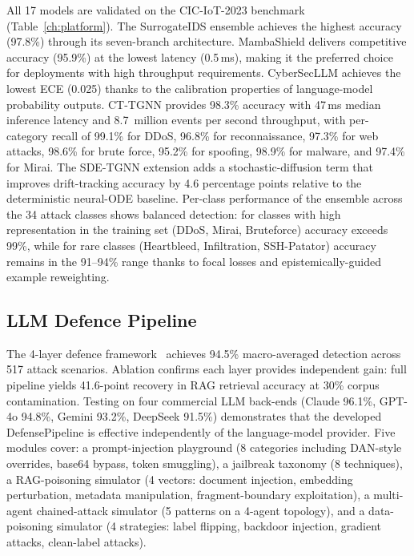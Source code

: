 All 17 models are validated on the CIC-IoT-2023 benchmark (Table~\ref{ch:platform}). The SurrogateIDS ensemble achieves the highest accuracy (97.8\%) through its seven-branch architecture. MambaShield delivers competitive accuracy (95.9\%) at the lowest latency (0.5\,ms), making it the preferred choice for deployments with high throughput requirements. CyberSecLLM achieves the lowest ECE (0.025) thanks to the calibration properties of language-model probability outputs. CT-TGNN provides 98.3\% accuracy with 47\,ms median inference latency and 8.7~million events per second throughput, with per-category recall of 99.1\% for DDoS, 96.8\% for reconnaissance, 97.3\% for web attacks, 98.6\% for brute force, 95.2\% for spoofing, 98.9\% for malware, and 97.4\% for Mirai. The SDE-TGNN extension adds a stochastic-diffusion term that improves drift-tracking accuracy by 4.6 percentage points relative to the deterministic neural-ODE baseline. Per-class performance of the ensemble across the 34 attack classes shows balanced detection: for classes with high representation in the training set (DDoS, Mirai, Bruteforce) accuracy exceeds 99\%, while for rare classes (Heartbleed, Infiltration, SSH-Patator) accuracy remains in the 91--94\% range thanks to focal losses and epistemically-guided example reweighting.

\subsection{LLM Defence Pipeline}

The 4-layer defence framework~\cite{Anaedevha2026neurips} achieves 94.5\% macro-averaged detection across 517 attack scenarios. Ablation confirms each layer provides independent gain: full pipeline yields 41.6-point recovery in RAG retrieval accuracy at 30\% corpus contamination. Testing on four commercial LLM back-ends (Claude 96.1\%, GPT-4o 94.8\%, Gemini 93.2\%, DeepSeek 91.5\%) demonstrates that the developed DefensePipeline is effective independently of the language-model provider. Five modules cover: a prompt-injection playground (8 categories including DAN-style overrides, base64 bypass, token smuggling), a jailbreak taxonomy (8 techniques), a RAG-poisoning simulator (4 vectors: document injection, embedding perturbation, metadata manipulation, fragment-boundary exploitation), a multi-agent chained-attack simulator (5 patterns on a 4-agent topology), and a data-poisoning simulator (4 strategies: label flipping, backdoor injection, gradient attacks, clean-label attacks).

